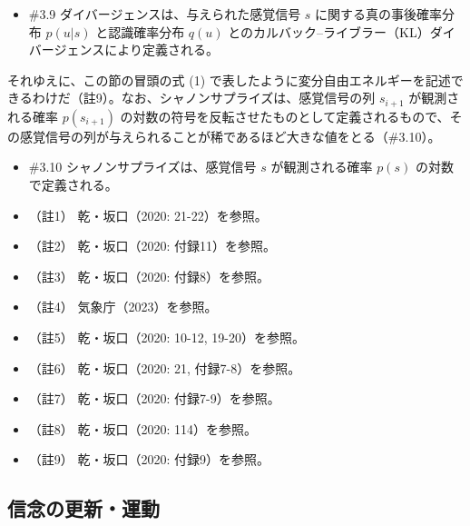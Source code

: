 \begin{note}{}
  \begin{itemize}
    \tightlist
    \item{\#3.9}
      ダイバージェンスは、与えられた感覚信号 $s$ に関する真の事後確率分布 $p(u|s)$ と認識確率分布 $q(u)$ とのカルバック–ライブラー（KL）ダイバージェンスにより定義される。
  \end{itemize}
\end{note}

それゆえに、この節の冒頭の式 (1)
で表したように変分自由エネルギーを記述できるわけだ（註9）。なお、シャノンサプライズは、感覚信号の列
\(s_{i+1}\) が観測される確率 \(p(s_{i+1})\)
の対数の符号を反転させたものとして定義されるもので、その感覚信号の列が与えられることが稀であるほど大きな値をとる（\#3.10）。

\begin{note}{}
  \begin{itemize}
    \tightlist
    \item{\#3.10}
      シャノンサプライズは、感覚信号 $s$ が観測される確率 $p(s)$ の対数で定義される。
  \end{itemize}
\end{note}

\begin{itemize}
\tightlist
\item
  （註1） 乾・坂口（2020: 21-22）\cite{InuiAndSakaguchi}を参照。
\item
  （註2） 乾・坂口（2020: 付録11）\cite{InuiAndSakaguchi}を参照。
\item
  （註3） 乾・坂口（2020: 付録8）\cite{InuiAndSakaguchi}を参照。
\item
  （註4） 気象庁（2023）\cite{JMA}を参照。
\item
  （註5） 乾・坂口（2020: 10-12, 19-20）\cite{InuiAndSakaguchi}を参照。
\item
  （註6） 乾・坂口（2020: 21, 付録7-8）\cite{InuiAndSakaguchi}を参照。
\item
  （註7） 乾・坂口（2020: 付録7-9）\cite{InuiAndSakaguchi}を参照。
\item
  （註8） 乾・坂口（2020: 114）\cite{InuiAndSakaguchi}を参照。
\item
  （註9） 乾・坂口（2020: 付録9）\cite{InuiAndSakaguchi}を参照。
\end{itemize}

\subsection{信念の更新・運動}\label{ux4fe1ux5ff5ux306eux66f4ux65b0ux904bux52d5}

